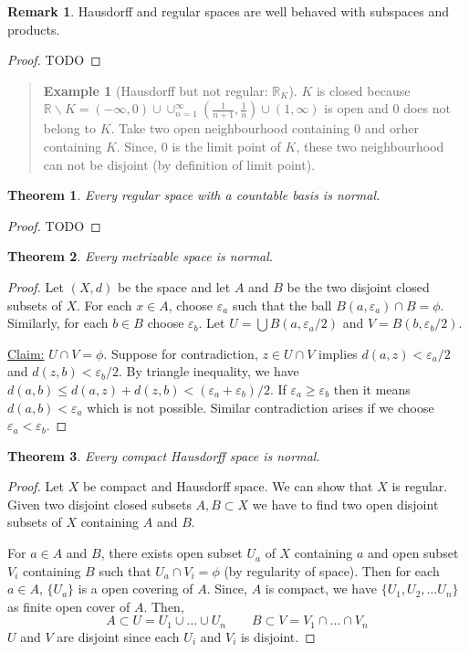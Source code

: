 \documentclass[12pt,reqno]{amsart}
\theoremstyle{plain}
\newtheorem{thm}{Theorem}
\theoremstyle{definition}
\newtheorem{eg}{Example}
\newtheorem{rem}{Remark}
\newcommand{\bb}[1]{\mathbb{#1}}
\begin{document}
\begin{rem}
    Hausdorff and regular spaces are well behaved with subspaces and products.
\end{rem}
\begin{proof}
    TODO
\end{proof}
\begin{quotation}
    \begin{eg}[Hausdorff but not regular: $\bb R_K$]
    $K$ is closed because $\bb R\backslash K = (-\infty,0) \cup \cup_{n=1}^{\infty}(\frac{1}{n+1},\frac{1}{n}) \cup (1,\infty)$ is open and $0$ does not belong to $K$. Take two open neighbourhood containing $0$ and orher containing $K$. Since, $0$ is the limit point of $K$, these two neighbourhood can not be disjoint (by definition of limit point).
    \end{eg}
\end{quotation}
\begin{thm}
    Every regular space with a countable basis is normal.
\end{thm}
\begin{proof}
    TODO
\end{proof}
\begin{thm}
    Every metrizable space is normal.
\end{thm}
\begin{proof}
    Let $(X,d)$ be the space and let $A$ and $B$ be the two disjoint closed subsets of $X$. For each $x \in A$, choose $\varepsilon_a$ such that the ball $B(a,\varepsilon_a) \cap B = \phi$. Similarly, for each $b \in B$ choose $\varepsilon_b$. Let $U = \bigcup B(a,\varepsilon_a/2)$ and $V = B(b,\varepsilon_b/2)$.

    \noindent \underline{Claim:} $U \cap V = \phi$. Suppose for contradiction, $z \in U \cap V$ implies $d(a,z) < \varepsilon_a/2$ and $d(z,b) < \varepsilon_b/2$. By triangle inequality, we have $d(a,b) \leq d(a,z) + d(z,b) < (\varepsilon_a + \varepsilon_b)/2$. If $\varepsilon_a \geq \varepsilon_b$ then it means $d(a,b) < \varepsilon_a$ which is not possible. Similar contradiction arises if we choose $\varepsilon_a < \varepsilon_b$.
\end{proof}
\begin{thm}
    Every compact Hausdorff space is normal.
\end{thm}
\begin{proof}
    Let $X$ be compact and Hausdorff space. We can show that $X$ is regular. Given two disjoint closed subsets $A,B \subset X$ we have to find two open disjoint subsets of $X$ containing $A$ and $B$.

    \noindent For $a\in A$ and $B$, there exists open subset $U_a$ of $X$ containing $a$ and open subset $V_i$ containing $B$ such that $U_a \cap V_i = \phi$ (by regularity of space). Then for each $a \in A$, $\{U_a\}$ is a open covering of $A$. Since, $A$ is compact, we have $\{U_1, U_2, \dots U_n\}$ as finite open cover of $A$. Then,
    $$ A \subset U = U_1 \cup \dots \cup U_n \qquad B \subset V = V_1 \cap \dots \cap V_n$$
    $U$ and $V$ are disjoint since each $U_i$ and $V_i$ is disjoint.    
\end{proof}
\end{document}
